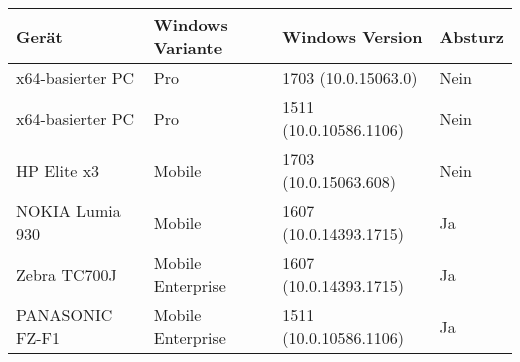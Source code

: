 

\begin{tabular}{llll}
  \hline
  \hline
  \rowcolor{heading}\textbf{Gerät} & \textbf{Windows Variante} & \textbf{Windows Version} & \textbf{Absturz} \\
  \hline
  \hline

  x64-basierter PC                 & Pro                       & 1703 (10.0.15063.0)      & Nein             \\
  x64-basierter PC                 & Pro                       & 1511 (10.0.10586.1106)   & Nein             \\
  HP Elite x3                      & Mobile                    & 1703 (10.0.15063.608)    & Nein             \\
  NOKIA Lumia 930                  & Mobile                    & 1607 (10.0.14393.1715)   & Ja               \\
  Zebra TC700J                     & Mobile Enterprise         & 1607 (10.0.14393.1715)   & Ja               \\
  PANASONIC FZ-F1                  & Mobile Enterprise         & 1511 (10.0.10586.1106)   & Ja               \\

  \hline
  \hline
\end{tabular}
